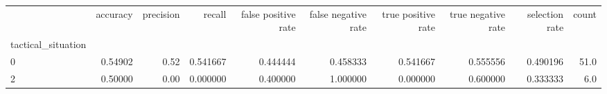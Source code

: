\begin{tabular}{lrrrrrrrrr}
\toprule
{} &  accuracy &  precision &    recall &  false positive rate &  false negative rate &  true positive rate &  true negative rate &  selection rate &  count \\
tactical\_situation &           &            &           &                      &                      &                     &                     &                 &        \\
\midrule
0                  &   0.54902 &       0.52 &  0.541667 &             0.444444 &             0.458333 &            0.541667 &            0.555556 &        0.490196 &   51.0 \\
2                  &   0.50000 &       0.00 &  0.000000 &             0.400000 &             1.000000 &            0.000000 &            0.600000 &        0.333333 &    6.0 \\
\bottomrule
\end{tabular}
